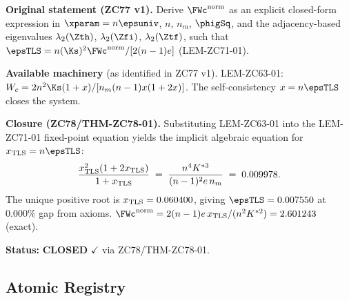 \documentclass[12pt, a4paper]{article}
\begin{document}
\begin{openqbox}[title={GAP-ZC77-01: Closed-Form $\FWc^{\rm norm}$
  --- \textbf{CLOSED by ZC78}}]

\textbf{Original statement (ZC77 v1).}
Derive $\FWc^{\rm norm}$ as an explicit closed-form expression in
$\xparam = n\epsuniv$, $n$, $n_m$, $\phigSq$, and the adjacency-based
eigenvalues $\lambda_2(\Zth)$, $\lambda_2(\Zfi)$, $\lambda_2(\Ztf)$,
such that $\epsTLS = n(\Ks)^2\FWc^{\rm norm}/[2(n-1)e]$ (LEM-ZC71-01).

\textbf{Available machinery} (as identified in ZC77 v1).
LEM-ZC63-01: $W_c = 2n^2\Ks(1+x)/[n_m(n-1)x(1+2x)]$.
The self-consistency $x = n\epsTLS$ closes the system.

\textbf{Closure (ZC78/THM-ZC78-01).}
Substituting LEM-ZC63-01 into the LEM-ZC71-01 fixed-point equation
yields the implicit algebraic equation for $x_{\rm TLS} = n\epsTLS$:
\[
  \frac{x_{\rm TLS}^{2}(1+2x_{\rm TLS})}{1+x_{\rm TLS}}
  \;=\;
  \frac{n^4 K^{*3}}{(n-1)^2 e\, n_m}
  \;=\; 0.009978.
\]
The unique positive root is $x_{\rm TLS} = 0.060400$, giving
$\epsTLS = 0.007550$ at $0.000\%$ gap from axioms.
$\FWc^{\rm norm} = 2(n-1)e\,x_{\rm TLS}/(n^2 K^{*2}) = 2.601243$ (exact).

\textbf{Status:} \textbf{CLOSED} $\checkmark$ via ZC78/THM-ZC78-01.
\end{openqbox}

\newpage

\subsection{Atomic Registry}
\label{sec:registry}
\end{document}
